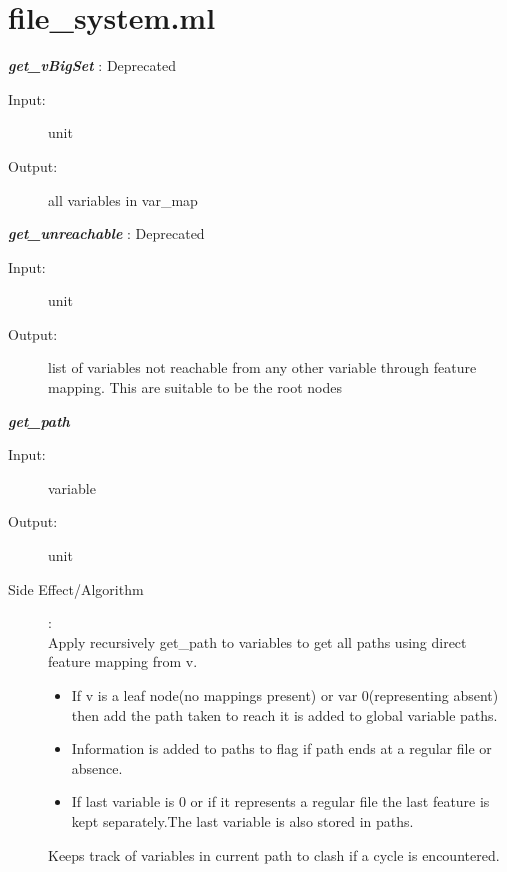 \documentclass[12pt]{article}
\begin{document}
\section{file\_system.ml}
\begin{description}

\item \textbf{\textit{get\_vBigSet}} : Deprecated
\begin{description}
    \item[Input:] unit
    \item[Output:] all variables in var\_map
\end{description}

\item \textbf{\textit{get\_unreachable}} : Deprecated
\begin{description}
    \item[Input:] unit
    \item[Output:] list of variables not reachable from any other variable through feature mapping. This are suitable to be the root nodes
\end{description}

\item \textbf{\textit{get\_path}}
\begin{description}
    \item[Input:] variable
    \item[Output:] unit
    \item[Side Effect/Algorithm]:\\Apply recursively get\_path to variables to get all paths using direct feature mapping from v.
    \begin{itemize}
            \item If v is a leaf node(no mappings present) or var 0(representing absent) then add the path taken to reach it is added to global variable paths.
            \item Information is added to paths to flag if path ends at a regular file or absence.
            \item If last variable is 0 or if it represents a regular file the last feature is kept separately.The last variable is also stored in paths.
    \end{itemize}
    Keeps track of variables in current path to clash if a cycle is encountered.
\end{description}


\end{description}
\end{document}
